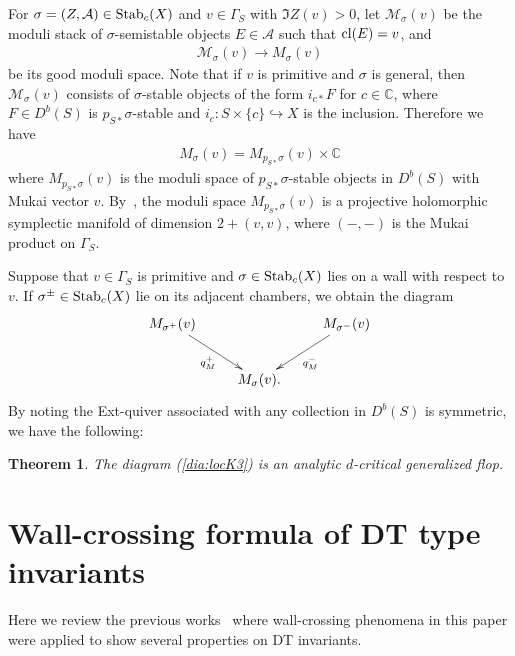 \documentclass[11pt]{amsart}
\theoremstyle{plain}
\newtheorem{thm}{Theorem}[section]
\theoremstyle{definition}
\theoremstyle{remark}
\newcommand{\aA}{\mathcal{A}}
\newcommand{\mM}{\mathcal{M}}
\newcommand{\Stab}{\mathop{\rm Stab}\nolimits}
\newcommand{\cl}{\mathop{\rm cl}\nolimits}
\begin{document}
For $\sigma=(Z, \aA) \in \Stab_c(X)$
and $v \in \Gamma_S$
with $\Im Z(v)>0$, 
let $\mM_{\sigma}(v)$ be 
the moduli stack of $\sigma$-semistable 
objects
$E \in \aA$ such that 
$\cl(E)=v$, 
and 
\begin{align*}
\mM_{\sigma}(v) \to M_{\sigma}(v)
\end{align*}
be its good moduli space. 
Note that if $v$ is primitive
and $\sigma$ is general, 
then $\mM_{\sigma}(v)$ consists of $\sigma$-stable objects
of the form $i_{c\ast}F$ for 
$c \in \mathbb{C}$, where
$F \in D^b(S)$ is $p_{S\ast}\sigma$-stable 
and $i_c \colon S \times \{c\} \hookrightarrow X$ is the 
inclusion. 
Therefore we have 
\begin{align*}
M_{\sigma}(v)=M_{p_{S\ast}\sigma}(v) \times \mathbb{C}
\end{align*}
where $M_{p_{S\ast}\sigma}(v)$ is the
moduli space of $p_{S\ast}\sigma$-stable objects
in $D^b(S)$ with Mukai vector $v$.
By~\cite{MR3194493}, the moduli space 
$M_{p_{S\ast}\sigma}(v)$
is a projective holomorphic symplectic 
manifold of dimension $2+(v, v)$, where 
$(-, -)$ is the Mukai product on $\Gamma_S$. 

Suppose that $v\in \Gamma_S$ is primitive and $\sigma \in \Stab_c(X)$ lies on a wall 
with respect to $v$. If $\sigma^{\pm} \in \Stab_c(X)$ lie on 
its adjacent chambers, we obtain the diagram
\begin{align}\label{dia:locK3}
\xymatrix{
M_{\sigma^{+}}(v) \ar[rd]_-{q_M^{+}}  & 
& M_{\sigma^{-}}(v)
 \ar[ld]^-{q_M^{-}} \\
& M_{\sigma}(v). &
}
\end{align}
By noting the Ext-quiver associated with 
any collection in $D^b(S)$ is symmetric, 
we have the following: 
\begin{thm}\label{thm:locK3}
The diagram (\ref{dia:locK3}) 
is an analytic $d$-critical generalized flop.
\end{thm}








\section{Wall-crossing formula of DT type invariants}\label{sec:append}
Here we review the 
previous 
works~\cite{BrH, Tcurve1, Tolim, Tolim2, Tsurvey, MR2888981} 
where wall-crossing phenomena in this paper 
were applied to show several properties on DT invariants. 
\end{document}
